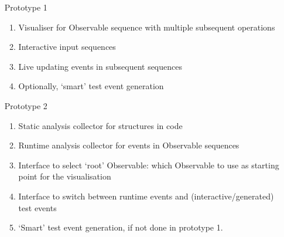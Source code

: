 \begin{enumerate}
    \item[Prototype 1]
        \begin{enumerate}
            \item
                Visualiser for Observable sequence with multiple
                subsequent operations
            \item
                Interactive input sequences
            \item
                Live updating events in subsequent sequences
            \item
                Optionally, `smart' test event generation
        \end{enumerate}
    \item[Prototype 2]
        \begin{enumerate}
            \item
                Static analysis collector for structures in code
            \item
                Runtime analysis collector for events in Observable
                sequences
            \item
                Interface to select `root' Observable:  which Observable
                to use as starting point for the visualisation
            \item
                Interface to switch between runtime events and (interactive/generated)
                test events
            \item
                `Smart' test event generation, if not done in prototype
                1.
        \end{enumerate}
\end{enumerate}


{}

